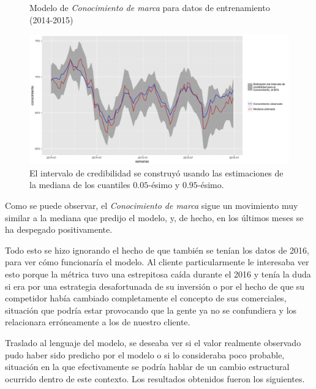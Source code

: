 \begin{figure}[H]
	\centering
	\caption{Modelo de \textit{Conocimiento de marca} para datos de entrenamiento (2014-2015)}
	\includegraphics[width=1\textwidth]{Figures/MarketResearch/fit_review.png}
	\captionsetup{singlelinecheck=off,font=footnotesize}
	\caption*{El intervalo de credibilidad se construy\'o usando las estimaciones de la mediana de los cuantiles $0.05$-\'esimo y $0.95$-\'esimo.}
	\label{awareness_fit}
\end{figure}

Como se puede observar, el \textit{Conocimiento de marca} sigue un movimiento muy similar a la mediana que predijo el modelo, y, de hecho, en los \'ultimos meses se ha despegado positivamente.

Todo esto se hizo ignorando el hecho de que tambi\'en se ten\'ian los datos de 2016, para ver c\'omo funcionar\'ia el modelo. Al cliente particularmente le interesaba ver esto porque la m\'etrica tuvo una estrepitosa ca\'ida durante el 2016 y ten\'ia la duda si era por una estrategia desafortunada de su inversi\'on o por el hecho de que su competidor hab\'ia cambiado completamente el concepto de sus comerciales, situaci\'on que podr\'ia estar provocando que la gente ya no se confundiera y los relacionara err\'oneamente a los de nuestro cliente.

Traslado al lenguaje del modelo, se deseaba ver si el valor realmente observado pudo haber sido predicho por el modelo o si lo consideraba poco probable, situaci\'on en la que efectivamente se podr\'ia hablar de un cambio estructural ocurrido dentro de este contexto. Los resultados obtenidos fueron los siguientes.

